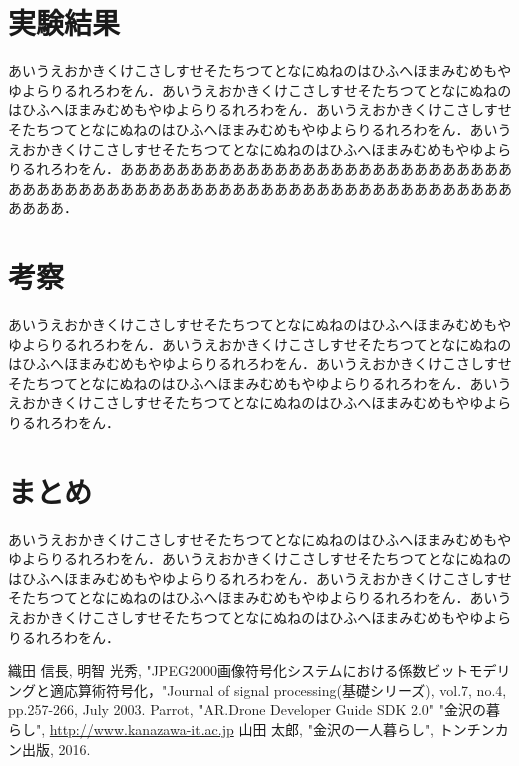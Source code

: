 \begin{multicols*}{2}
	
		\section{実験結果}
	あいうえおかきくけこさしすせそたちつてとなにぬねのはひふへほまみむめもやゆよらりるれろわをん．あいうえおかきくけこさしすせそたちつてとなにぬねのはひふへほまみむめもやゆよらりるれろわをん．あいうえおかきくけこさしすせそたちつてとなにぬねのはひふへほまみむめもやゆよらりるれろわをん．あいうえおかきくけこさしすせそたちつてとなにぬねのはひふへほまみむめもやゆよらりるれろわをん．ああああああああああああああああああああああああああああああああああああああああああああああああああああああああああああああああああああ．	
	\section{考察}
		あいうえおかきくけこさしすせそたちつてとなにぬねのはひふへほまみむめもやゆよらりるれろわをん．あいうえおかきくけこさしすせそたちつてとなにぬねのはひふへほまみむめもやゆよらりるれろわをん．あいうえおかきくけこさしすせそたちつてとなにぬねのはひふへほまみむめもやゆよらりるれろわをん．あいうえおかきくけこさしすせそたちつてとなにぬねのはひふへほまみむめもやゆよらりるれろわをん．
	\section{まとめ}
		あいうえおかきくけこさしすせそたちつてとなにぬねのはひふへほまみむめもやゆよらりるれろわをん．あいうえおかきくけこさしすせそたちつてとなにぬねのはひふへほまみむめもやゆよらりるれろわをん．あいうえおかきくけこさしすせそたちつてとなにぬねのはひふへほまみむめもやゆよらりるれろわをん．あいうえおかきくけこさしすせそたちつてとなにぬねのはひふへほまみむめもやゆよらりるれろわをん．


\begin{thebibliography}{99}
 織田 信長, 明智 光秀, "JPEG2000画像符号化システムにおける係数ビットモデリングと適応算術符号化，"Journal of signal processing(基礎シリーズ), vol.7, no.4, pp.257-266, July 2003.
Parrot, "AR.Drone Developer Guide SDK 2.0"
 "金沢の暮らし", \url{http://www.kanazawa-it.ac.jp}
 山田 太郎, "金沢の一人暮らし", トンチンカン出版, 2016.
\end{thebibliography}


\end{multicols*} 


